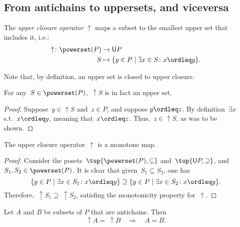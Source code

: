 
\subsection{From antichains to uppersets, and viceversa}
\begin{definition}
\label{def:upperclosure}
The \emph{upper closure operator} $\uparrow$ maps a subset to the smallest upper set that includes it, i.e.:
\begin{equation}
    \begin{aligned}
    \uparrow \colon \powerset(P)&\to \mathsf{U}P\\
    S&\mapsto \{y\in P \mid \exists x\in S \colon x\ordleq y\}.
    \end{aligned}
\end{equation}
\end{definition}
\begin{remark}
Note that, by definition, an upper set is closed to upper closure.
\end{remark}
\begin{remark}
For any~$S\in \powerset(P)$,~$\uparrow S$ is in fact an upper set.
\begin{proof}
Suppose~$y\in \uparrow S$ and~$z\in P$, and suppose $y\ordleq z$. By definition~$\exists x$ s.t.~$x\ordleq y$, meaning that~$x\ordleq z$. Thus,~$z\in \uparrow S$, as was to be shown.
\end{proof}
\end{remark}

\begin{lemma}
The upper closure operator~$\uparrow$ is a monotone map.
\end{lemma}
\begin{proof}
Consider the posets~$\tup{\powerset(P),\subseteq}$ and~$\tup{\mathsf{U}P,\supseteq}$, and~$S_1,S_2\in \powerset(P)$. It is clear that given~$S_1\subseteq S_2$, one has
\begin{equation}
    \{y\in P\mid \exists x\in S_1\colon x\ordleq y\} \supseteq \{y\in P\mid \exists x\in S_2\colon x\ordleq y\}.
\end{equation}
Therefore,~$\uparrow S_1\supseteq \ \uparrow S_2$, satisfing the monotonicity property for~$\uparrow$.
\end{proof}

\begin{lemma}\label{up-cl-inj-antichains}
Let $A$ and $B$ be subsets of $P$ that are antichains. Then
\begin{equation}
\uparrow A = \ \uparrow B \quad \Rightarrow \quad A = B.
\end{equation}
\end{lemma}

